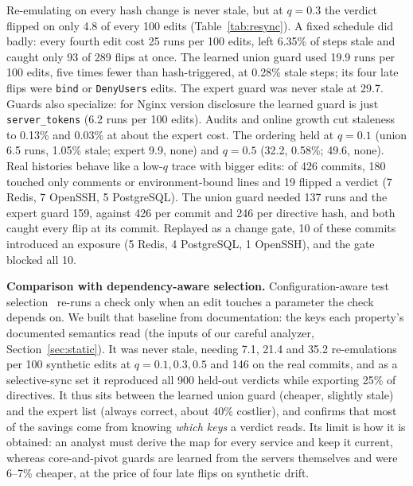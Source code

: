 \documentclass[conference]{IEEEtran}
\begin{document}
Re-emulating on every hash change is never stale, but at $q=0.3$ the verdict flipped on only 4.8 of every 100 edits (Table~\ref{tab:resync}). A fixed schedule did badly: every fourth edit cost 25 runs per 100 edits, left 6.35\% of steps stale and caught only 93 of 289 flips at once. The learned union guard used 19.9 runs per 100 edits, five times fewer than hash-triggered, at 0.28\% stale steps; its four late flips were \texttt{bind} or \texttt{DenyUsers} edits. The expert guard was never stale at 29.7. Guards also specialize: for Nginx version disclosure the learned guard is just \texttt{server\_tokens} (6.2 runs per 100 edits). Audits and online growth cut staleness to 0.13\% and 0.03\% at about the expert cost. The ordering held at $q=0.1$ (union 6.5 runs, 1.05\% stale; expert 9.9, none) and $q=0.5$ (32.2, 0.58\%; 49.6, none). Real histories behave like a low-$q$ trace with bigger edits: of 426 commits, 180 touched only comments or environment-bound lines and 19 flipped a verdict (7 Redis, 7 OpenSSH, 5 PostgreSQL). The union guard needed 137 runs and the expert guard 159, against 426 per commit and 246 per directive hash, and both caught every flip at its commit. Replayed as a change gate, 10 of these commits introduced an exposure (5 Redis, 4 PostgreSQL, 1 OpenSSH), and the gate blocked all 10.

\textbf{Comparison with dependency-aware selection.} Configuration-aware test selection~\cite{ctest2020,urts2023} re-runs a check only when an edit touches a parameter the check depends on. We built that baseline from documentation: the keys each property's documented semantics read (the inputs of our careful analyzer, Section~\ref{sec:static}). It was never stale, needing 7.1, 21.4 and 35.2 re-emulations per 100 synthetic edits at $q=0.1,0.3,0.5$ and 146 on the real commits, and as a selective-sync set it reproduced all 900 held-out verdicts while exporting 25\% of directives. It thus sits between the learned union guard (cheaper, slightly stale) and the expert list (always correct, about 40\% costlier), and confirms that most of the savings come from knowing \emph{which keys} a verdict reads. Its limit is how it is obtained: an analyst must derive the map for every service and keep it current, whereas core-and-pivot guards are learned from the servers themselves and were 6--7\% cheaper, at the price of four late flips on synthetic drift.
\end{document}
